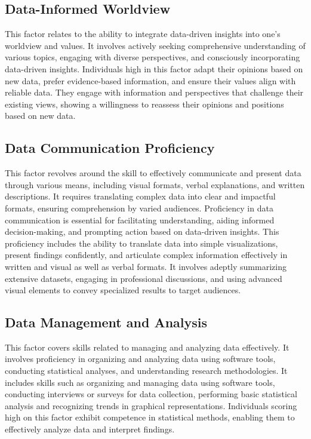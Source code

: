 \documentclass[
  12pt,
  a4paper,
  twoside]{article}
\begin{document}
\hypertarget{data-informed-worldview}{%
\subsection{Data-Informed Worldview}\label{data-informed-worldview}}

This factor relates to the ability to integrate data-driven insights into one's worldview and values. It involves actively seeking comprehensive understanding of various topics, engaging with diverse perspectives, and consciously incorporating data-driven insights. Individuals high in this factor adapt their opinions based on new data, prefer evidence-based information, and ensure their values align with reliable data. They engage with information and perspectives that challenge their existing views, showing a willingness to reassess their opinions and positions based on new data.

\hypertarget{data-communication-proficiency}{%
\subsection{Data Communication Proficiency}\label{data-communication-proficiency}}

This factor revolves around the skill to effectively communicate and present data through various means, including visual formats, verbal explanations, and written descriptions.
It requires translating complex data into clear and impactful formats, ensuring comprehension by varied audiences. Proficiency in data communication is essential for facilitating understanding, aiding informed decision-making, and prompting action based on data-driven insights. This proficiency includes the ability to translate data into simple visualizations, present findings confidently, and articulate complex information effectively in written and visual as well as verbal formats. It involves adeptly summarizing extensive datasets, engaging in professional discussions, and using advanced visual elements to convey specialized results to target audiences.

\hypertarget{data-management-and-analysis}{%
\subsection{Data Management and Analysis}\label{data-management-and-analysis}}

This factor covers skills related to managing and analyzing data effectively. It involves proficiency in organizing and analyzing data using software tools, conducting statistical analyses, and understanding research methodologies.
It includes skills such as organizing and managing data using software tools, conducting interviews or surveys for data collection, performing basic statistical analysis and recognizing trends in graphical representations. Individuals scoring high on this factor exhibit competence in statistical methods, enabling them to effectively analyze data and interpret findings.
\end{document}
